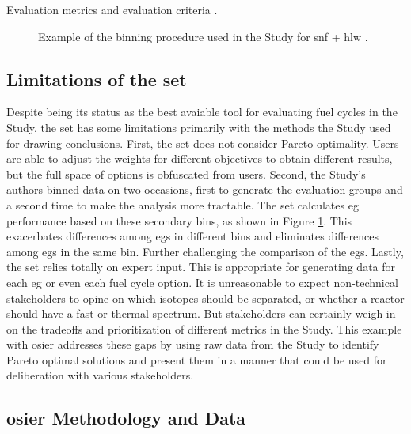 \begin{table}[htbp!]
    \centering
    \caption{Evaluation metrics and evaluation criteria
    \cite{wigeland_nuclear_2014-2}.}
    \label{tab:evaluation-metrics}
    \resizebox{0.75\columnwidth}{!}{}
\end{table}


\begin{figure}[htbp!]
    \centering
    \resizebox{0.65\columnwidth}{!}{}    
    \caption{Example of the binning procedure used in the Study for \ac{snf} +
    \ac{hlw} \cite{wigeland_nuclear_2014-1}.}
    \label{fig:bin-plot}
\end{figure}

\FloatBarrier

\subsection{Limitations of the \ac{set}}
Despite being its status as the best avaiable tool for evaluating fuel cycles in the Study, the
\ac{set} has some limitations primarily with the methods the Study used for drawing conclusions.
First, the \ac{set} does not consider Pareto optimality. Users are able to adjust the weights
for different objectives to obtain different results, but the full space of options is obfuscated
from users. Second, the Study's authors binned data on two occasions, first to generate the 
evaluation groups and a second time to make the analysis more tractable. The \ac{set} calculates
\ac{eg} performance based on these secondary bins, as shown in Figure \ref{fig:bin-plot}. This
exacerbates differences among \acp{eg} in different bins and eliminates differences among \acp{eg}
in the same bin. Further challenging the comparison of the \acp{eg}. Lastly, the \ac{set} relies 
totally on expert input. This is appropriate for generating data for each \ac{eg} or even each fuel
cycle option. It is unreasonable to expect non-technical stakeholders to opine on which isotopes
should be separated, or whether a reactor should have a fast or thermal spectrum. But stakeholders
can certainly weigh-in on the tradeoffs and prioritization of different metrics in the Study. This
example with \ac{osier} addresses these gaps by using raw data from the Study to identify Pareto
optimal solutions and present them in a manner that could be used for deliberation with various
stakeholders. 

\subsection{\ac{osier} Methodology and Data}

